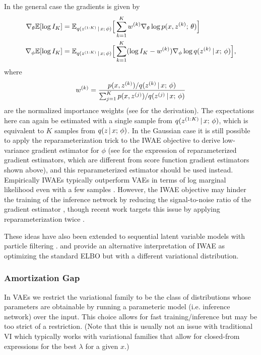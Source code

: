 \documentclass{article}
\begin{document}
In the general case the gradients is given by
\begin{align*}
    \nabla_{\theta} \mathbb{E}[\log I_K] &= \mathbb{E}_{q(z^{(1:K)} \,|\, x ; \, \phi)}\Big[\sum_{k=1}^K w^{(k)} \nabla_{\theta}  \log p(x, z^{(k)} ; \, \theta) \Big] \\
    \nabla_{\phi} \mathbb{E}[\log I_K] &= \mathbb{E}_{q(z^{(1:K)}  \,|\, x ; \, \phi)}\Big[\sum_{k=1}^K (\log I_K - w^{(k)}) \nabla_\phi \log q(z^{(k)} \,|\, x ; \, \phi)  \Big],
\end{align*} 
where 
\[ w^{(k)} = \frac{p(x, z^{(k)})/q(z^{(k)} \,|\, x ; \, \phi)}{\sum_{j=1}^K p(x, z^{(j)})/q(z^{(j)} \,|\, x ; \, \phi)}\]
are the normalized importance weights (see \cite{Mnih2016} for the derivation). The expectations here can again be estimated with a single sample from $q(z^{(1:K)} \,|\, x ; \, \phi)$, which is equivalent to $K$ samples from $q(z \,|\, x ; \, \phi)$. In the Gaussian case it is still possible to apply the reparameterization trick to the IWAE objective to derive low-variance gradient estimator for $\phi$ (see \cite{Burda2015} for the expression of reparameterized gradient estimators, which are different from score function gradient estimators shown above), and this reparameterized estimator should be used instead. Empirically IWAEs typically outperform VAEs in terms of log marginal likelihood even with a few samples \citep{Burda2015,Mnih2016}. However, the IWAE objective may hinder the training of the inference network
by reducing the signal-to-noise ratio of the gradient estimator \citep{Rainforth2018},
though recent work targets this issue by applying reparameterization twice \citep{tucker2018double}.

These ideas have also been extended to sequential latent variable models with particle filtering \citep{maddison2017fivo,naesseth2018seqmc,le2018}. \cite{cremer2017iwae} and \cite{Domke2018} provide an alternative interpretation of IWAE as optimizing the standard ELBO but with a different variational distribution.

\subsubsection{Amortization Gap}
In VAEs we restrict the variational family to be the class of distributions whose parameters
are obtainable by running  a parameteric model (i.e. inference network) over the input.
This choice allows for fast training/inference but may be too strict of a restriction. (Note that
this is usually not an issue with traditional VI which typically works with variational families that allow
for closed-from expressions for the best $\lambda$ for a given $x$.)
\end{document}
